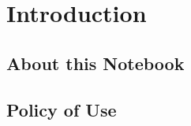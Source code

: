 
\chapter{Introduction}
\label{chapter1}

\section{About this Notebook}
\label{section1.1}

\section{Policy of Use}
\label{section1.2}
